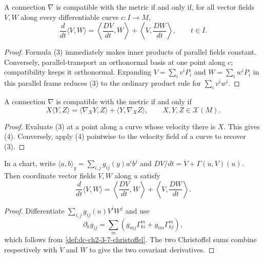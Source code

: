 \begin{proposition}
  \label{prop:dc-ch2-3-2}


  A connection $\nabla$ is compatible with the metric if and only if, for all
  vector fields $V,W$ along every differentiable curve $c\colon I\to M$,
  \[
    \frac{d}{dt}\langle V,W\rangle
      =\left\langle\frac{DV}{dt},W\right\rangle
       +\left\langle V,\frac{DW}{dt}\right\rangle,
    \qquad t\in I.\tag{3}
  \]
\end{proposition}
\begin{proof}

  \sketch
  Formula (3) immediately makes inner products of parallel fields constant.
  Conversely, parallel-transport an orthonormal basis at one point along $c$;
  compatibility keeps it orthonormal. Expanding
  $V=\sum_iv^iP_i$ and $W=\sum_iw^iP_i$ in this parallel frame reduces (3) to
  the ordinary product rule for $\sum_iv^iw^i$.
\end{proof}

\begin{corollary}
  \label{cor:dc-ch2-3-3}


  A connection $\nabla$ is compatible with the metric if and only if
  \[
    X\langle Y,Z\rangle
      =\langle\nabla_XY,Z\rangle+\langle Y,\nabla_XZ\rangle,
    \qquad X,Y,Z\in\mathcal{X}(M).\tag{4}
  \]
\end{corollary}
\begin{proof}
  \sketch
  Evaluate (3) at a point along a curve whose velocity there is $X$. This gives
  (4). Conversely, apply (4) pointwise to the velocity field of a curve to
  recover (3).
\end{proof}

\begin{lemma}
  \label{lem:dc-ch2-3-2-coord}


  In a chart, write
  $\langle a,b\rangle_y=\sum_{i,j}g_{ij}(y)a^ib^j$ and
  $DV/dt=\dot V+\Gamma(\dot u,V)(u)$. Then coordinate vector fields $V,W$
  along $u$ satisfy
  \[
    \frac{d}{dt}\langle V,W\rangle
      =\left\langle\frac{DV}{dt},W\right\rangle
       +\left\langle V,\frac{DW}{dt}\right\rangle.
  \]
\end{lemma}
\begin{proof}

  \sketch
  Differentiate $\sum_{i,j}g_{ij}(u)V^iW^j$ and use
  \[
    \partial_kg_{ij}
      =\sum_m\left(g_{mj}\Gamma^m_{ki}+g_{im}\Gamma^m_{kj}\right),
  \]
  which follows from \cref{def:dc-ch2-3-7-christoffel}. The two Christoffel
  sums combine respectively with $\dot V$ and $\dot W$ to give the two
  covariant derivatives.
\end{proof}

